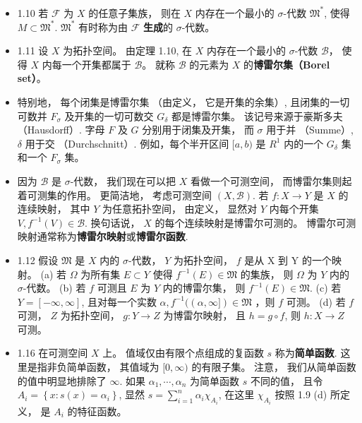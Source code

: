 \begin{itemize}
\item 1.10 若 $\mathscr{F}$ 为 $X$ 的任意子集族， 则在 $X$ 内存在一个最小的 $\sigma$-代数 $\mathfrak{M}^{*}$, 使得 $M \subset \mathfrak{M}^{*}$. $\mathfrak{M}^{*}$ 有时称为由 $\mathscr{F}$ \textbf{生成}的 $\sigma$-代数。

\item 1.11 设 $X$ 为拓扑空间。 由定理 1.10, 在 $X$ 内存在一个最小的 $\sigma$-代数 $\mathscr B$， 使得 $X$ 内每一个开集都属于 $\mathscr B$。 就称 $\mathscr B$ 的元素为 $X$ 的\textbf{博雷尔集（Borel set）}。

\item 特别地， 每个闭集是博雷尔集 （由定义， 它是开集的余集）, 且闭集的一切可数并 $F_{\sigma}$ 及开集的一切可数交 $G_{\delta}$ 都是博雷尔集。 该记号来源于豪斯多夫 （Hausdorff）. 字母 $F$ 及 $G$ 分别用于闭集及开集， 而 $\sigma$ 用于并 （Summe）, $\delta$ 用于交 （Durchschnitt）. 例如，每个半开区间 $[a, b)$ 是 $R^{1}$ 内的一个 $G_{\delta}$ 集和一个 $F_{\sigma}$ 集。

\item 因为 $\mathscr{B}$ 是 $\sigma$-代数， 我们现在可以把 $X$ 看做一个可测空间， 而博雷尔集则起着可测集的作用。 更简洁地， 考虑可测空间 $(X, \mathscr{B})$. 若 $f: X \rightarrow Y$ 是 $X$ 的连续映射， 其中 $Y$ 为任意拓扑空间， 由定义， 显然对 $Y$ 内每个开集 $V, f^{-1}(V) \in \mathscr{B}$. 换句话说， $X$ 的每个连续映射是博雷尔可测的。 博雷尔可测映射通常称为\textbf{博雷尔映射}或\textbf{博雷尔函数}.

\item 1.12 假设 $\mathfrak{M}$ 是 $X$ 内的 $\sigma$-代数， $Y$ 为拓扑空间， $f$ 是从 $\mathrm{X}$ 到 $\mathrm{Y}$ 的一个映射。
(a) 若 $\Omega$ 为所有集 $E \subset Y$ 使得 $f^{-1}(E) \in \mathfrak{M}$ 的集族， 则 $\Omega$ 为 $Y$ 内的 $\sigma$-代数。
(b) 若 $f$ 可测且 $E$ 为 $Y$ 内的博雷尔集， 则 $f^{-1}(E) \in \mathfrak{M}$.
(c) 若 $Y=[-\infty, \infty]$, 且对每一个实数 $\alpha, f^{-1}((\alpha, \infty]) \in \mathfrak{M}$ ，则 $f$ 可测。
(d) 若 $f$ 可测， $Z$ 为拓扑空间， $g: Y \rightarrow Z$ 为博雷尔映射， 且 $h=g \circ f$, 则 $h: X \rightarrow Z$ 可测。

\item 1.16 在可测空间 $X$ 上。 值域仅由有限个点组成的复函数 $s$ 称为\textbf{简单函数}. 这里是指非负简单函数， 其值域为 $[0, \infty)$ 的有限子集。 注意， 我们从简单函数的值中明显地排除了 $\infty$. 如果 $\alpha_{1}, \cdots, \alpha_{n}$ 为简单函数 $s$ 不同的值， 且令 $A_{i}=\left\{x: s(x)=\alpha_{i}\right\}$, 显然 $s=\sum_{i=1}^{n} \alpha_{i} \chi_{A_{i}}$, 在这里 $\chi_{A_{i}}$ 按照 1.9 (d) 所定义， 是 $A_{i}$ 的特征函数。


\end{itemize}
